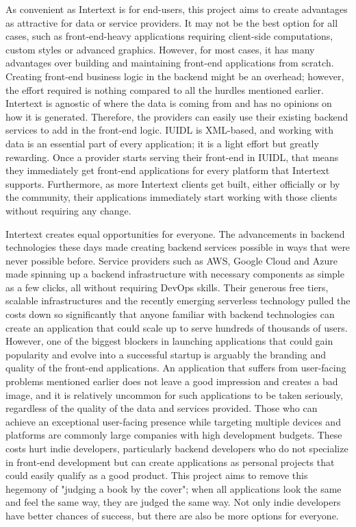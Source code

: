 As convenient as Intertext is for end-users, this project aims to create advantages as attractive for data or service providers. It may not be the best option for all cases, such as front-end-heavy applications requiring client-side computations, custom styles or advanced graphics. However, for most cases, it has many advantages over building and maintaining front-end applications from scratch. Creating front-end business logic in the backend might be an overhead; however, the effort required is nothing compared to all the hurdles mentioned earlier. Intertext is agnostic of where the data is coming from and has no opinions on how it is generated. Therefore, the providers can easily use their existing backend services to add in the front-end logic. IUIDL is XML-based, and working with data is an essential part of every application; it is a light effort but greatly rewarding. Once a provider starts serving their front-end in IUIDL, that means they immediately get front-end applications for every platform that Intertext supports. Furthermore, as more Intertext clients get built, either officially or by the community, their applications immediately start working with those clients without requiring any change. 

Intertext creates equal opportunities for everyone. The advancements in backend technologies these days made creating backend services possible in ways that were never possible before. Service providers such as AWS, Google Cloud and Azure made spinning up a backend infrastructure with necessary components as simple as a few clicks, all without requiring DevOps skills. Their generous free tiers, scalable infrastructures and the recently emerging serverless technology pulled the costs down so significantly that anyone familiar with backend technologies can create an application that could scale up to serve hundreds of thousands of users. However, one of the biggest blockers in launching applications that could gain popularity and evolve into a successful startup is arguably the branding and quality of the front-end applications. An application that suffers from user-facing problems mentioned earlier does not leave a good impression and creates a bad image, and it is relatively uncommon for such applications to be taken seriously, regardless of the quality of the data and services provided. Those who can achieve an exceptional user-facing presence while targeting multiple devices and platforms are commonly large companies with high development budgets. These costs hurt indie developers, particularly backend developers who do not specialize in front-end development but can create applications as personal projects that could easily qualify as a good product. This project aims to remove this hegemony of "judging a book by the cover"; when all applications look the same and feel the same way, they are judged the same way. Not only indie developers have better chances of success, but there are also be more options for everyone.